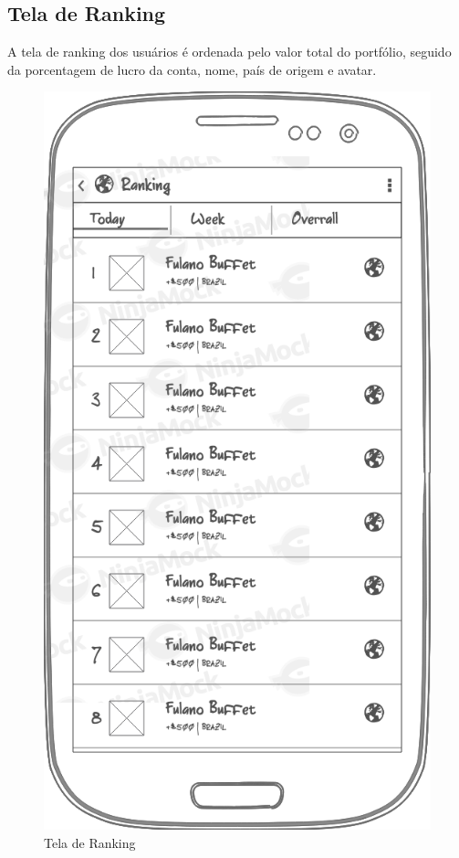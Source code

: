 \subsection{Tela de Ranking}
A tela de ranking dos usuários é ordenada pelo valor total do portfólio, seguido da porcentagem de lucro da conta, nome, país de origem e avatar.

\begin{figure}[H]
  \caption{\label{fig:mock_login}Tela de Ranking}
  \centering
  \includegraphics[scale=0.4]{imagens/mocks/ranking.png}
\end{figure}

